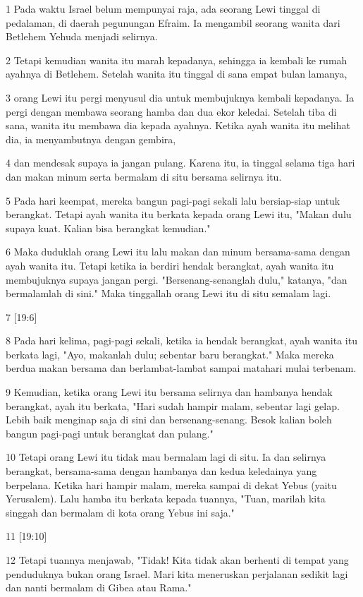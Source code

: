 \par 1 Pada waktu Israel belum mempunyai raja, ada seorang Lewi tinggal di pedalaman, di daerah pegunungan Efraim. Ia mengambil seorang wanita dari Betlehem Yehuda menjadi selirnya.
\par 2 Tetapi kemudian wanita itu marah kepadanya, sehingga ia kembali ke rumah ayahnya di Betlehem. Setelah wanita itu tinggal di sana empat bulan lamanya,
\par 3 orang Lewi itu pergi menyusul dia untuk membujuknya kembali kepadanya. Ia pergi dengan membawa seorang hamba dan dua ekor keledai. Setelah tiba di sana, wanita itu membawa dia kepada ayahnya. Ketika ayah wanita itu melihat dia, ia menyambutnya dengan gembira,
\par 4 dan mendesak supaya ia jangan pulang. Karena itu, ia tinggal selama tiga hari dan makan minum serta bermalam di situ bersama selirnya itu.
\par 5 Pada hari keempat, mereka bangun pagi-pagi sekali lalu bersiap-siap untuk berangkat. Tetapi ayah wanita itu berkata kepada orang Lewi itu, "Makan dulu supaya kuat. Kalian bisa berangkat kemudian."
\par 6 Maka duduklah orang Lewi itu lalu makan dan minum bersama-sama dengan ayah wanita itu. Tetapi ketika ia berdiri hendak berangkat, ayah wanita itu membujuknya supaya jangan pergi. "Bersenang-senanglah dulu," katanya, "dan bermalamlah di sini." Maka tinggallah orang Lewi itu di situ semalam lagi.
\par 7 [19:6]
\par 8 Pada hari kelima, pagi-pagi sekali, ketika ia hendak berangkat, ayah wanita itu berkata lagi, "Ayo, makanlah dulu; sebentar baru berangkat." Maka mereka berdua makan bersama dan berlambat-lambat sampai matahari mulai terbenam.
\par 9 Kemudian, ketika orang Lewi itu bersama selirnya dan hambanya hendak berangkat, ayah itu berkata, "Hari sudah hampir malam, sebentar lagi gelap. Lebih baik menginap saja di sini dan bersenang-senang. Besok kalian boleh bangun pagi-pagi untuk berangkat dan pulang."
\par 10 Tetapi orang Lewi itu tidak mau bermalam lagi di situ. Ia dan selirnya berangkat, bersama-sama dengan hambanya dan kedua keledainya yang berpelana. Ketika hari hampir malam, mereka sampai di dekat Yebus (yaitu Yerusalem). Lalu hamba itu berkata kepada tuannya, "Tuan, marilah kita singgah dan bermalam di kota orang Yebus ini saja."
\par 11 [19:10]
\par 12 Tetapi tuannya menjawab, "Tidak! Kita tidak akan berhenti di tempat yang penduduknya bukan orang Israel. Mari kita meneruskan perjalanan sedikit lagi dan nanti bermalam di Gibea atau Rama."
